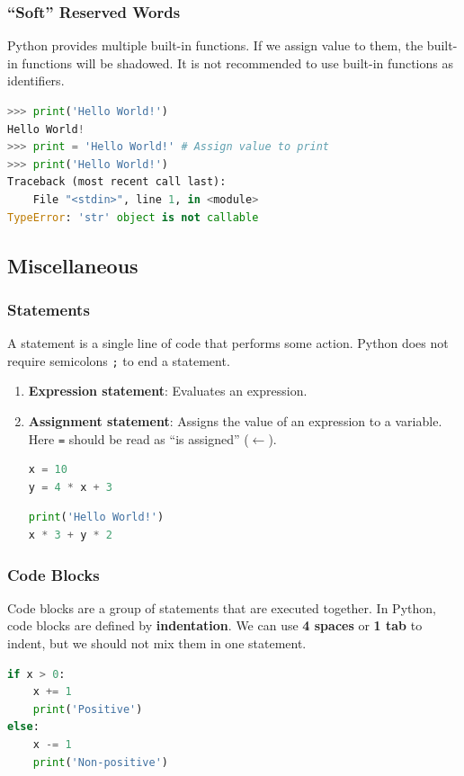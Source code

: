 \documentclass[beamer, en, version=2.0]{huangfusl-template}
\begin{document}
    \begin{frame}[fragile]
        \frametitle{``Soft'' Reserved Words}

        Python provides multiple built-in functions. If we assign value to them, the built-in functions will be shadowed. It is not recommended to use built-in functions as identifiers.

\begin{lstlisting}[language=python]
>>> print('Hello World!')
Hello World!
>>> print = 'Hello World!' # Assign value to print
>>> print('Hello World!')
Traceback (most recent call last):
    File "<stdin>", line 1, in <module>
TypeError: 'str' object is not callable
\end{lstlisting}
    \end{frame}
    \subsection{Miscellaneous}
    \begin{frame}[fragile]
        \frametitle{Statements}

        A statement is a single line of code that performs some action. Python does not require semicolons {\footnotesize\verb|;|} to end a statement.

        \begin{enumerate}
            \item \textbf{Expression statement}: Evaluates an expression.
            \item \textbf{Assignment statement}: Assigns the value of an expression to a variable. Here {\footnotesize\verb|=|} should be read as ``is assigned'' ($\leftarrow$).
\begin{lstlisting}[language=python]
x = 10
y = 4 * x + 3
\end{lstlisting}
\begin{lstlisting}[language=python]
print('Hello World!')
x * 3 + y * 2
\end{lstlisting}
        \end{enumerate}
    \end{frame}
    \begin{frame}[fragile]
        \frametitle{Code Blocks}

        Code blocks are a group of statements that are executed together. In Python, code blocks are defined by \textbf{indentation}. We can use \textbf{4 spaces} or \textbf{1 tab} to indent, but we should not mix them in one statement.

\begin{lstlisting}[language=python, showspaces=true, showstringspaces=true]
if x > 0:
    x += 1
    print('Positive')
else:
    x -= 1
    print('Non-positive')
\end{lstlisting}
    \end{frame}
\end{document}
